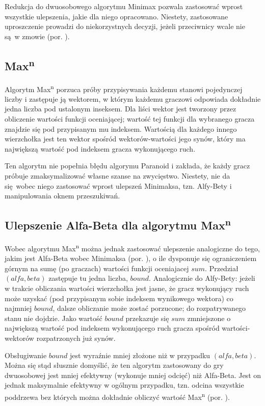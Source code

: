 \documentclass{pracamgr}
\begin{document}
Redukcja do dwuosobowego algorytmu Minimax pozwala zastosować wprost wszystkie ulepszenia, jakie dla niego opracowano.
Niestety, zastosowane uproszczenie prowadzi do niekorzystnych decyzji, jeżeli przeciwnicy wcale nie są w zmowie (por. \cite{sturtevant}).

\subsection{Max\textsuperscript{n}}

Algorytm Max\textsuperscript{n} porzuca próby przypisywania każdemu stanowi pojedynczej liczby i zastępuje ją wektorem, w którym każdemu graczowi odpowiada dokładnie jedna liczba pod ustalonym inseksem.
Dla liści wektor jest tworzony przez obliczenie wartości funkcji oceniającej; wartość tej funkcji dla wybranego gracza znajdzie się pod przypisanym mu indeksem.
Wartością dla każdego innego wierzchołka jest ten wektor spośród wektorów-wartości jego synów, który ma największą wartość pod indeksem gracza wykonującego ruch.

Ten algorytm nie popełnia błędu algorymu Paranoid i zakłada, że każdy gracz próbuje zmaksymalizować własne szanse na zwycięstwo.
Niestety, nie da się wobec niego zastosować wprost ulepszeń Minimaksa, tzn. Alfy-Bety i manipulowania oknem przeszukiwań.

\subsection{Ulepszenie Alfa-Beta dla algorytmu Max\textsuperscript{n}}

Wobec algorytmu Max\textsuperscript{n} można jednak zastosować ulepszenie analogiczne do tego, jakim jest Alfa-Beta wobec Minimaksa (por. \cite{korf}), o ile dysponuje się ograniczeniem górnym na sumę (po graczach) wartości funkcji oceniajacej \(sum\).
Przedział \((alfa, beta)\) zastępuje tu jedna liczba, \(bound\).
Analogicznie do Alfy-Bety: jeżeli w trakcie obliczania wartości wierzchołka jest jasne, że gracz wykonujący ruch może uzyskać (pod przypisanym sobie indeksem wynikowego wektora) co najmniej \(bound\), dalsze obliczanie może zostać porzucone; do rozpatrywanego stanu nie dojdzie.
Jako wartość \(bound\) przekazuje się \(sum\) zmniejszone o największą wartość pod indeksem wykonującego ruch gracza spośród wartości-wektorów rozpatrzonych już synów.

Obsługiwanie \(bound\) jest wyraźnie mniej złożone niż w przypadku \((alfa, beta)\).
Można się stąd słusznie domyślić, że ten algorytm zastosowany do gry dwuosobowej jest mniej efektywny (wykonuje mniej odcięć) niż Alfa-Beta.
Jest on jednak maksymalnie efektywny w ogólnym przypadku, tzn. odcina wszystkie poddrzewa bez których można dokładnie obliczyć wartość Max\textsuperscript{n} (por. \cite{korf}).
\end{document}
